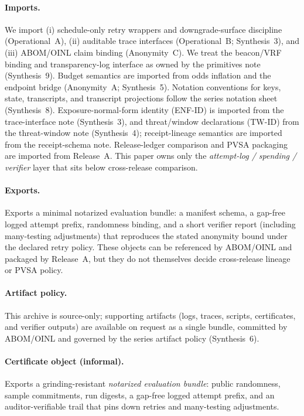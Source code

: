 \documentclass[11pt]{article}
\begin{document}
\paragraph{Imports.}
We import (i) schedule-only retry wrappers and downgrade-surface discipline (Operational~A), (ii) auditable trace interfaces (Operational~B; Synthesis~3), and (iii) ABOM/OINL claim binding (Anonymity~C). We treat the beacon/VRF binding and transparency-log interface as owned by the primitives note (Synthesis~9).\cite{series:transparencyprimitives}
Budget semantics are imported from odds inflation and the endpoint bridge (Anonymity~A; Synthesis~5).\cite{series:oddsinflation,series:endpointbridge,series:abomoinl}
Notation conventions for keys, state, transcripts, and transcript projections follow the series notation sheet (Synthesis~8). Exposure-normal-form identity (ENF-ID) is imported from the trace-interface note (Synthesis~3), and threat/window declarations (TW-ID) from the threat-window note (Synthesis~4); receipt-lineage semantics are imported from the receipt-schema note. Release-ledger comparison and PVSA packaging are imported from Release~A.\cite{series:notation,series:traceifaces,series:threatwindows,series:receiptitems,series:releaseproperty}
This paper owns only the \emph{attempt-log / spending / verifier} layer that sits below cross-release comparison.

\paragraph{Exports.}
Exports a minimal notarized evaluation bundle: a manifest schema, a gap-free logged attempt prefix, randomness binding, and a short verifier report (including many-testing adjustments) that reproduces the stated anonymity bound under the declared retry policy.
These objects can be referenced by ABOM/OINL and packaged by Release~A, but they do not themselves decide cross-release lineage or PVSA policy.\cite{series:abomoinl,series:releaseproperty}

\paragraph{Artifact policy.}
This archive is source-only; supporting artifacts (logs, traces, scripts, certificates, and verifier outputs) are available on request as a single bundle, committed by ABOM/OINL and governed by the series artifact policy (Synthesis~6).\cite{series:artifactpolicy}


\paragraph{Certificate object (informal).}
Exports a grinding-resistant \emph{notarized evaluation bundle}: public randomness, sample commitments, run digests, a gap-free logged attempt prefix,
and an auditor-verifiable trail that pins down retries and many-testing adjustments.
\end{document}
